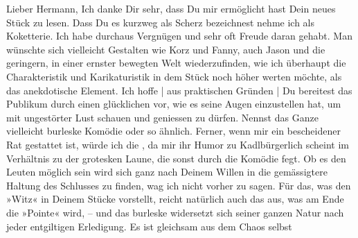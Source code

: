 \pstart{}Lieber Hermann,\pend\vspace{0.5em}
\pstart
           Ich danke Dir sehr, dass Du mir ermöglicht hast Dein neues Stück zu lesen. Dass Du es kurzweg als
               Scherz bezeichnest nehme ich als Koketterie. Ich habe durchaus Vergnügen und sehr oft
               Freude daran gehabt. Man wünschte sich vielleicht Gestalten wie Korz und Fanny, auch Jason und die geringern, in einer ernster bewegten Welt
               wiederzufinden, wie ich überhaupt die Charakteristik und Karikaturistik in dem Stück
               noch höher werten möchte, als das anekdotische Element. Ich hoffe | aus praktischen
               Gründen | Du bereitest das Publikum durch einen glücklichen \label{K_L01721-1v}\label{K_L01721-1}{ }\label{T_L01721-1v}\label{T_L01721-1} vor, wie es seine Augen
               einzustellen hat, um mit ungestörter Lust schauen und geniessen zu dürfen. Nennst das
               Ganze vielleicht burleske Komödie oder so ähnlich. Ferner, wenn mir ein bescheidener
               Rat gestattet ist, würde ich die \label{K_L01721-2v}\label{K_L01721-2}, da mir ihr Humor zu Kadlbürgerlich scheint im Verhältnis zu der grotesken Laune, die sonst durch
               die Komödie fegt. Ob es den Leuten möglich sein wird sich ganz nach Deinem {\pb}Willen in die
               gemässigtere Haltung des Schlusses zu finden, wag ich nicht vorher zu sagen. Für das,
               was den »Witz« in Deinem Stücke vorstellt, reicht natürlich auch das aus, was am Ende
               die »Pointe« wird, \introOben{}–\introOben{} und das burleske widersetzt sich seiner
               ganzen Natur nach jeder entgiltigen Erledigung. Es ist gleichsam aus dem Chaos selbst
